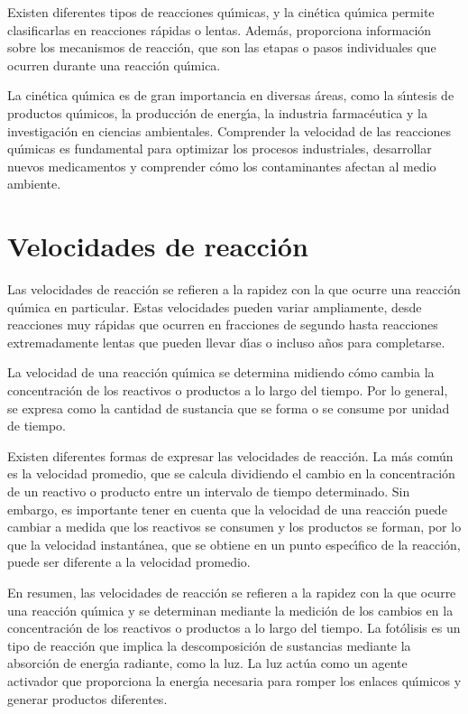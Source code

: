 Existen diferentes tipos de reacciones qu\'{\i}micas, y la cin\'etica qu\'{\i}mica permite clasificarlas en reacciones r\'apidas o lentas. Adem\'as, proporciona informaci\'on sobre los mecanismos de reacci\'on, que son las etapas o pasos individuales que ocurren durante una reacci\'on qu\'{\i}mica.

La cin\'etica qu\'{\i}mica es de gran importancia en diversas \'areas, como la s\'{\i}ntesis de productos qu\'{\i}micos, la producci\'on de energ\'{\i}a, la industria farmac\'eutica y la investigaci\'on en ciencias ambientales. Comprender la velocidad de las reacciones qu\'{\i}micas es fundamental para optimizar los procesos industriales, desarrollar nuevos medicamentos y comprender c\'omo los contaminantes afectan al medio ambiente.


\section{Velocidades de reacci\'on}\label{vreac}
Las velocidades de reacci\'on se refieren a la rapidez con la que ocurre una reacci\'on qu\'{\i}mica en particular. Estas velocidades pueden variar ampliamente, desde reacciones muy r\'apidas que ocurren en fracciones de segundo hasta reacciones extremadamente lentas que pueden llevar d\'{\i}as o incluso a\~nos para completarse.

La velocidad de una reacci\'on qu\'{\i}mica se determina midiendo c\'omo cambia la concentraci\'on de los reactivos o productos a lo largo del tiempo. Por lo general, se expresa como la cantidad de sustancia que se forma o se consume por unidad de tiempo.

Existen diferentes formas de expresar las velocidades de reacci\'on. La m\'as com\'un es la velocidad promedio, que se calcula dividiendo el cambio en la concentraci\'on de un reactivo o producto entre un intervalo de tiempo determinado. Sin embargo, es importante tener en cuenta que la velocidad de una reacci\'on puede cambiar a medida que los reactivos se consumen y los productos se forman, por lo que la velocidad instant\'anea, que se obtiene en un punto espec\'{\i}fico de la reacci\'on, puede ser diferente a la velocidad promedio.

En resumen, las velocidades de reacci\'on se refieren a la rapidez con la que ocurre una reacci\'on qu\'{\i}mica y se determinan mediante la medici\'on de los cambios en la concentraci\'on de los reactivos o productos a lo largo del tiempo. La fot\'olisis es un tipo de reacci\'on que implica la descomposici\'on de sustancias mediante la absorci\'on de energ\'{\i}a radiante, como la luz. La luz act\'ua como un agente activador que proporciona la energ\'{\i}a necesaria para romper los enlaces qu\'{\i}micos y generar productos diferentes.

